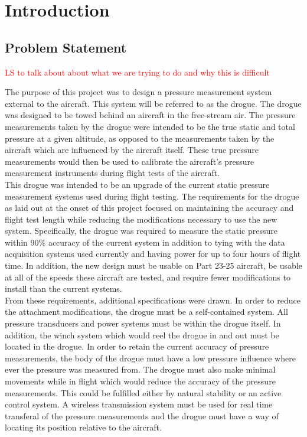 \section{Introduction}
\label{sec:introduction}

\subsection{Problem Statement}
\textcolor{red}{LS to talk about about what we are trying to do and why this is difficult}

The purpose of this project was to design a pressure measurement system external to the aircraft. This system will be referred to as the drogue. The drogue was designed to be towed behind an aircraft in the free-stream air. The pressure measurements taken by the drogue were intended to be the true static and total pressure at a given altitude, as opposed to the measurements taken by the aircraft which are influenced by the aircraft itself. These true pressure measurements would then be used to calibrate the aircraft's pressure measurement instruments during flight tests of the aircraft.\\  

This drogue was intended to be an upgrade of the current static pressure measurement systems used during flight testing. The requirements for the drogue as laid out at the onset of this project focused on maintaining the accuracy and flight test length while reducing the modifications necessary to use the new system. Specifically, the drogue was required to measure the static pressure within 90\% accuracy of the current system in addition to tying with the data acquisition systems used currently and having power for up to four hours of flight time. In addition, the new design must be usable on Part 23-25 aircraft, be usable at all of the speeds these aircraft are tested, and require fewer modifications to install than the current systems.\\

From these requirements, additional specifications were drawn. In order to reduce the attachment modifications, the drogue must be a self-contained system. All pressure transducers and power systems must be within the drogue itself. In addition, the winch system which would reel the drogue in and out must be located in the drogue. In order to retain the current accuracy of pressure measurements, the body of the drogue must have a low pressure influence where ever the pressure was measured from. The drogue must also make minimal movements while in flight which would reduce the accuracy of the pressure measurements. This could be fulfilled either by natural stability or an active control system. A wireless transmission system must be used for real time transferal of the pressure measurements and the drogue must have a way of locating its position relative to the aircraft.\\ 

